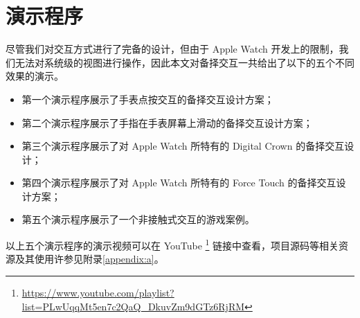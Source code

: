 \section{演示程序}

尽管我们对交互方式进行了完备的设计，但由于 Apple Watch 开发上的限制，我们无法对系统级的视图进行操作，因此本文对备择交互一共给出了以下的五个不同效果的演示。

\begin{itemize}
    \kaishu
    \item 第一个演示程序展示了手表点按交互的备择交互设计方案；
    \item 第二个演示程序展示了手指在手表屏幕上滑动的备择交互设计方案；
    \item 第三个演示程序展示了对 Apple Watch 所特有的 Digital Crown 的备择交互设计；
    \item 第四个演示程序展示了对 Apple Watch 所特有的 Force Touch 的备择交互设计方案；
    \item 第五个演示程序展示了一个非接触式交互的游戏案例。
\end{itemize}

以上五个演示程序的演示视频可以在 YouTube
\footnote{\url{https://www.youtube.com/playlist?list=PLwUqqMt5en7c2QaQ_DkuvZm9dGTz6RjRM}}
链接中查看，项目源码等相关资源及其使用许参见附录\ref{appendix:a}。

\cleardoublepage
